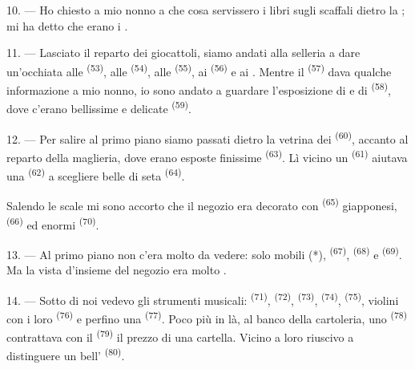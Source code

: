10. --- Ho chiesto a mio nonno a che cosa servissero i libri sugli scaffali dietro la
; mi ha detto che erano i .

\VUsaut{3.6mm}
\VUsaut{2.8mm}

11. --- Lasciato il reparto dei giocattoli, siamo andati alla selleria a dare
un'occhiata alle  \textsuperscript{(53)}, alle 
\textsuperscript{(54)}, alle  \textsuperscript{(55)}, ai
 \textsuperscript{(56)} e ai . Mentre il
 \textsuperscript{(57)} dava qualche informazione a mio nonno, io
sono andato a guardare l'esposizione di  e di
 \textsuperscript{(58)}, dove c'erano bellissime
 e delicate  \textsuperscript{(59)}.

12. --- Per salire al primo piano siamo passati dietro la vetrina dei 
\textsuperscript{(60)}, accanto al reparto della maglieria, dove erano esposte
finissime  \textsuperscript{(63)}. Lì vicino un 
\textsuperscript{(61)} aiutava una  \textsuperscript{(62)} a scegliere
belle  di seta \textsuperscript{(64)}.

Salendo le scale mi sono accorto che il negozio era decorato con 
\textsuperscript{(65)} giapponesi,  \textsuperscript{(66)} ed enormi
 \textsuperscript{(70)}.

13. --- Al primo piano non c'era molto da vedere: solo mobili (*), 
\textsuperscript{(67)},  \textsuperscript{(68)} e
 \textsuperscript{(69)}. Ma la vista d'insieme del negozio era molto
.

14. --- Sotto di noi vedevo gli strumenti musicali: 
\textsuperscript{(71)},  \textsuperscript{(72)},
 \textsuperscript{(73)},  \textsuperscript{(74)},
 \textsuperscript{(75)}, violini con i loro 
\textsuperscript{(76)} e perfino una  \textsuperscript{(77)}. Poco
più in là, al banco della cartoleria, uno  \textsuperscript{(78)}
contrattava con il  \textsuperscript{(79)} il prezzo di una cartella.
Vicino a loro riuscivo a distinguere un bell'
\textsuperscript{(80)}.

